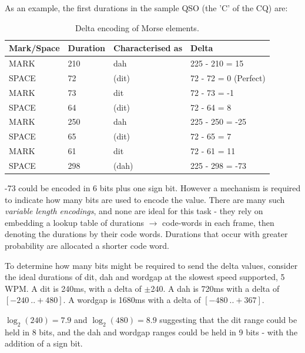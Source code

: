 \documentclass[a4paper]{tufte-handout}
\begin{document}
As an example, the first durations in the sample QSO (the 'C' of the CQ) are:
    \begin{table}[h]
        \selectfont
        \begin{tabular}{llll}
            \toprule
            Mark/Space & Duration & Characterised as & Delta \\
            \midrule
            MARK   & 210 & dah   & 225 - 210 = 15 \\
            SPACE  & 72  & (dit) & 72 - 72 = 0 (Perfect) \\
            MARK   & 73  & dit   & 72 - 73 = -1 \\
            SPACE  & 64  & (dit) & 72 - 64 = 8 \\
            MARK   & 250 & dah   & 225 - 250 = -25 \\
            SPACE  & 65  & (dit) & 72 - 65 = 7 \\
            MARK   & 61  & dit   & 72 - 61 = 11 \\
            SPACE  & 298 & (dah) & 225 - 298 = -73 \\
		\end{tabular}
		\caption{Delta encoding of Morse elements.}
		\label{table:delta-encoding}
	\end{table}

-73 could be encoded in 6 bits plus one sign bit. However a mechanism is required to indicate how many bits are used to encode the value. There are many such \emph{variable length encodings}, and none are ideal for this task - they rely on embedding a lookup table of durations $\rightarrow$ code-words in each frame, then denoting the durations by their code words. Durations that occur with greater probability are allocated a shorter code word.

To determine how many bits might be required to send the delta values, consider the ideal durations of dit, dah and wordgap at the slowest speed supported, 5 WPM. A dit is 240ms, with a delta of $\pm$240. A dah is 720ms with a delta of $[-240  ~.. +480]$.  A wordgap is 1680ms with a delta of $[-480  ~..  +367]$. 

$\log_2\left(240\right) = 7.9$ and $\log_2\left(480\right) = 8.9$ suggesting that the dit range could be held in 8 bits, and the dah and wordgap ranges could be held in 9 bits - with the addition of a sign bit.
\end{document}

